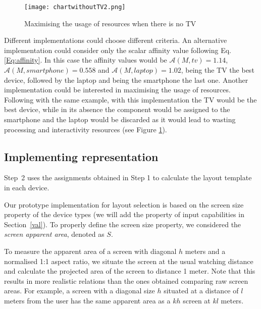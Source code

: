 \begin{figure}
	\begin{center}
		\texttt{[image: chartwithoutTV2.png]}
		\caption{Maximising the usage of resources when there is no TV}
		\label{fig:chartwithoutTV}
	\end{center}
\end{figure}

Different implementations could choose different criteria. An alternative implementation could consider only the scalar affinity value following Eq. \ref{Eq:affinity}. In this case the affinity values would be $\mathcal{A}(M,tv) = 1.14$, $\mathcal{A}(M,smartphone) = 0.558$ and $\mathcal{A}(M,laptop) = 1.02$, being the TV the best device, followed by the laptop and being the smartphone the last one. Another implementation could be interested in maximising the usage of resources. Following with the same example, with this implementation the TV would be the best device, while in its absence the component would be assigned to the smartphone and the laptop would be discarded as it would lead to wasting processing and interactivity resources (see Figure \ref{fig:chartwithoutTV}).


\subsection{Implementing representation}
\label{Imp-s2}

Step~2 uses the assignments obtained in Step 1 to calculate the layout template in each device. 

Our prototype implementation for layout selection is based on the screen size property of the device types (we will add the property of input capabilities in Section~\ref{val}).
To properly define the screen size property, we considered the \emph{screen apparent area}, denoted as $S$. 

To measure the apparent area of a screen with diagonal $h$ meters and a normalised 1:1 aspect ratio, we situate the screen at the usual watching distance and calculate the projected area of the screen to distance 1 meter.
Note that this results in more realistic relations than the ones obtained comparing raw screen areas.
For example, a screen with a diagonal size $h$ situated at a distance of $l$ meters from the user has the same apparent area as a $kh$ screen at $kl$ meters.

